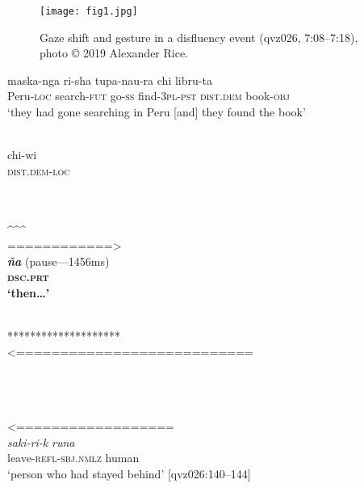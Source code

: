 \documentclass[output=paper]{langscibook}
\begin{document}
  
\begin{figure}
\texttt{[image: fig1.jpg]}
\caption{\label{fig:rice:1}Gaze shift and gesture in a disfluency event (qvz026, 7:08--7:18), photo © 2019 Alexander Rice.}
\end{figure}



\ea%
    \label{ex:rice:2}
\ea \label{ex:rice:2a}
 {maska-nga} {ri-sha} {tupa-nau-ra} {chi} {libru-ta}\\
         {Peru-\textsc{loc}} {search-\textsc{fut}} {go-\textsc{ss}} {find-\textsc{3pl-pst}} {\textsc{dist.dem}} {book-\textsc{obj}}\\
    \glt ‘they had gone searching in Peru [and] they found the book’
\medskip

\ex \label{ex:rice:2b}
 \\
{chi-wi}\\
\textsc{dist.dem-loc}\\
 \\
\medskip

\ex \label{ex:rice:2c}
\glllll {} {}\\
{} {\hspace{2cm}\textasciicircum\textasciicircum\textasciicircum} \\
{} {============>} \\
{\textit{\textbf{ña}}}  {(pause—1456ms)}\\
{\textbf{\textsc{dsc.prt}}} {}\\
\glt  \textbf{‘then…’}\\
\medskip

\ex \label{ex:rice:2d}
\\
{********************}\\
{<===========================}\\
{}\\
{}\\
\\
\medskip

\ex  \label{ex:rice:2e}\glll 
{<==================} \\
{\textit{saki-ri-k}} {\textit{runa}}\\
{leave-\textsc{refl-sbj.nmlz}} {\hspace{0.05cm}human}\\
\glt  ‘person who had stayed behind’ [qvz026:140--144]
\z
\z
\end{document}
